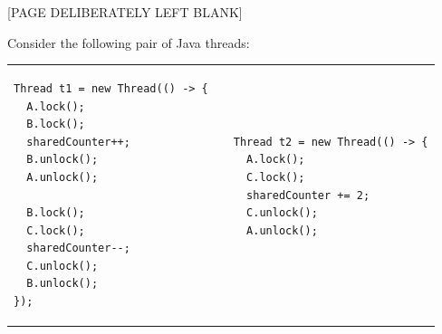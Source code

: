 \documentclass[addpoints]{exam}
\begin{document}
\begin{questions}

\newpage
\begin{center}
  [PAGE DELIBERATELY LEFT BLANK]
\end{center}
\newpage

\question Consider the following pair of Java threads:

  \begin{tabular}{p{.45\linewidth}|cp{.45\linewidth}}
  \begin{verbatim}
Thread t1 = new Thread(() -> {
  A.lock();
  B.lock();
  sharedCounter++;
  B.unlock();
  A.unlock();

  B.lock();
  C.lock();
  sharedCounter--;
  C.unlock();
  B.unlock();
});
\end{verbatim}
    &
\quad &
\begin{verbatim}
Thread t2 = new Thread(() -> {
  A.lock();
  C.lock();
  sharedCounter += 2;
  C.unlock();
  A.unlock();


\end{verbatim}
\end{tabular}
\end{questions}
\end{document}
